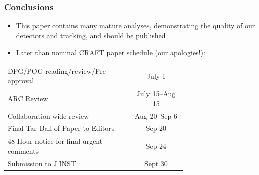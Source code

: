 \documentclass[compress]{beamer}
\begin{document}
\begin{frame}
\frametitle{Conclusions}

\begin{itemize}\setlength{\itemsep}{0.25 cm}
\item This paper contains many mature analyses, demonstrating the quality of our detectors and tracking, and should be published
\item Later than nominal CRAFT paper schedule (our apologies!):
\end{itemize}

\vfill \renewcommand{\arraystretch}{1.25}
\begin{tabular}{p{0.7\linewidth} c}
DPG/POG reading/review/Pre-approval & July 1 \\
ARC Review & July 15--Aug 15 \\
Collaboration-wide review & Aug 20--Sep 6 \\
Final Tar Ball of Paper to Editors & Sep 20 \\
48 Hour notice for final urgent comments & Sep 24 \\
Submission to J.INST & Sept 30
\end{tabular}

\label{numpages}
\end{frame}
\end{document}
